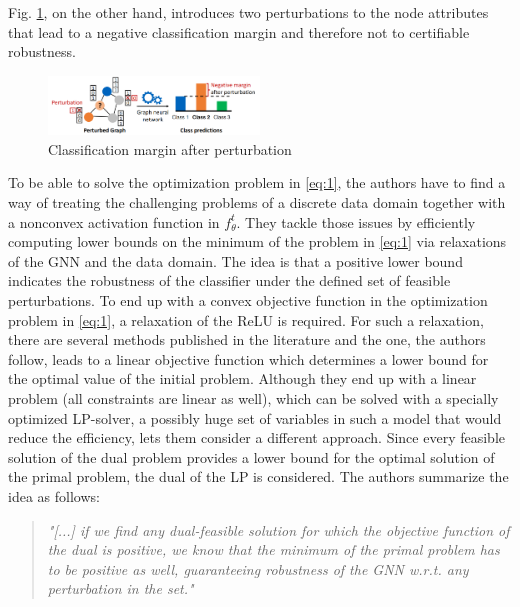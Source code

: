 \documentclass[a4paper,preprint]{sig-alternate}
\begin{document}
Fig. \ref{fig:after_pert}, on the other hand, introduces two perturbations to the node attributes that lead to a negative
classification margin and therefore not to certifiable robustness.

\vfill
\pagebreak

\begin{figure}[h]
    \centering
    \includegraphics[width=0.5\textwidth]{img/after_pert.png}
    \caption{Classification margin after perturbation \cite{Zuegner_2019}}
    \label{fig:after_pert}
\end{figure}

To be able to solve the optimization problem in \ref{eq:1}, the authors have to find a way of treating the challenging
problems of a discrete data domain together with a nonconvex activation function in $f_{\theta}^t$. \cite{Zuegner_2019}
They tackle those issues by efficiently computing lower bounds on the minimum of the problem in \ref{eq:1} via relaxations 
of the GNN and the data domain. The idea is that a positive lower bound indicates the robustness of the classifier under 
the defined set of feasible perturbations.
To end up with a convex objective function in the optimization problem in \ref{eq:1}, a relaxation of the ReLU is required. \cite{Zuegner_2019} 
For such a relaxation, there are several methods published in the literature and the one, the authors follow,
leads to a linear objective function which determines a lower bound for the optimal value of the initial problem.
Although they end up with a linear problem (all constraints are linear as well), which can be solved with a specially optimized LP-solver,
a possibly huge set of variables in such a model that would reduce the efficiency, lets them consider a different approach.
Since every feasible solution of the dual problem provides a lower bound for the optimal solution of the primal problem, 
the dual of the LP is considered. \cite{Zuegner_2019} The authors summarize the idea as follows:
\begin{quote}
    \emph{"[...] if we find any dual-feasible solution for which the objective function of the dual is positive, we know that the minimum of 
    the primal problem has to be positive as well, guaranteeing robustness of the GNN w.r.t. any perturbation in the set."} \cite{Zuegner_2019}
\end{quote}
\end{document}

